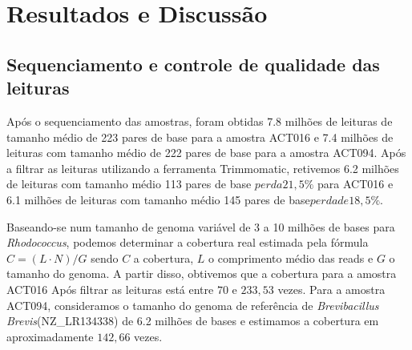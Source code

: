 \chapter{Resultados e Discussão}\label{cap:resultados}

\section{Sequenciamento e controle de qualidade das leituras}
Após o sequenciamento das amostras, foram obtidas 7.8 milhões de leituras de tamanho médio de 
223 pares de base para a amostra ACT016 e 7.4 milhões de leituras com tamanho médio de 222 pares de base
para a amostra ACT094. Após a filtrar as leituras utilizando a ferramenta Trimmomatic, retivemos
6.2 milhões de leituras com tamanho médio 113 pares de base \(perda 21,5\%\) para ACT016 e 6.1 milhões
de leituras com tamanho médio 145 pares de base\(perda de 18,5\%\).

Baseando-se num tamanho de genoma variável de 3 a 10 milhões de bases para \textit{Rhodococcus}, podemos
determinar a cobertura real estimada pela fórmula $C= (L\cdot N)/G $ sendo $C$ a cobertura, $L$ o comprimento
médio das reads e $G$ o tamanho do genoma. A partir disso, obtivemos que a cobertura para a amostra ACT016 Após
filtrar as leituras está entre $70$ e $233,53$ vezes. 
Para a amostra ACT094, consideramos o tamanho do genoma de referência de \textit{Brevibacillus Brevis}(NZ\_LR134338) 
de 6.2 milhões de bases e estimamos a cobertura em aproximadamente $142,66$ vezes.

